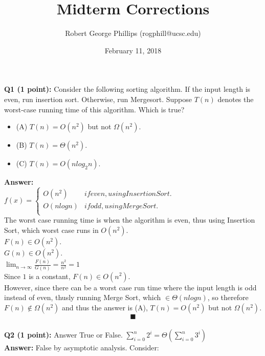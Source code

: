 \documentclass[a4paper,12pt]{article}
\title{Midterm Corrections}
\author{Robert George Phillips (rogphill@ucsc.edu)}
\date{February 11, 2018}
\begin{document}
\maketitle
\textbf{Q1 (1 point):} Consider the following sorting algorithm. If the input length is even, run insertion
sort. Otherwise, run Mergesort. Suppose $T(n)$ denotes the worst-case running time of this
algorithm. Which is true?
\begin{itemize}
\item (A) $T(n) = O(n^2)$ but not $\Omega(n^2)$.
\item (B) $T(n) = \Theta(n^2)$.
\item (C) $T(n) = O(n log_2 n)$.
\end{itemize}
\textbf{Answer:}\\

 $f(x) = \begin{cases}
O(n^2) &  if even, using Insertion Sort.\\
O(nlogn) &  if odd, using Merge Sort.\\
\end{cases} $\\

The worst case running time is when the algorithm is even, thus using Insertion Sort, which worst case runs in $O(n^2)$.\\

$F(n) \in O(n^2)$.\\

$G(n) \in O(n^2)$.\\

$\lim_{n\to\infty} \frac{F(n)}{G(n)} = \frac{n^2}{n^2} = 1$\\

Since $1$ is a constant, $F(n) \in O(n^2)$.\\

However, since there can be a worst case run time where the input length is odd instead of even, thusly running Merge Sort, which $\in \Theta(nlogn)$, so therefore $F(n) \notin \Omega(n^2)$ and thus the answer is (A),  $T(n) = O(n^2)$ but not $\Omega(n^2)$.\\

$$\blacksquare$$\\

\textbf{Q2 (1 point):} Answer True or False. $\sum_{i=0}^{n}2^i = \Theta(\sum_{i=0}^{n}3^i)$\\

\textbf{Answer:} False by asymptotic analysis. Consider:\\
\end{document}
